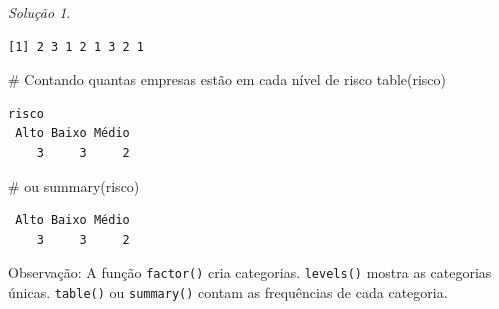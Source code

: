 \documentclass[
  portuguese,
  letterpaper,
  DIV=11,
  numbers=noendperiod]{scrreprt}
\newenvironment{Shaded}{\begin{snugshade}}{\end{snugshade}}
\newcommand{\CommentTok}[1]{\textcolor[rgb]{0.37,0.37,0.37}{#1}}
\newcommand{\FunctionTok}[1]{\textcolor[rgb]{0.28,0.35,0.67}{#1}}
\newcommand{\NormalTok}[1]{\textcolor[rgb]{0.00,0.23,0.31}{#1}}
\theoremstyle{definition}
\theoremstyle{remark}
\newtheorem*{solution}{Solução}
\begin{document}
\begin{solution}
\begin{verbatim}
[1] 2 3 1 2 1 3 2 1
\end{verbatim}

\begin{Shaded}
\begin{Highlighting}[]
\CommentTok{\# Contando quantas empresas estão em cada nível de risco}
\FunctionTok{table}\NormalTok{(risco)}
\end{Highlighting}
\end{Shaded}

\begin{verbatim}
risco
 Alto Baixo Médio 
    3     3     2 
\end{verbatim}

\begin{Shaded}
\begin{Highlighting}[]
\CommentTok{\# ou}
\FunctionTok{summary}\NormalTok{(risco)}
\end{Highlighting}
\end{Shaded}

\begin{verbatim}
 Alto Baixo Médio 
    3     3     2 
\end{verbatim}

Observação: A função \texttt{factor()} cria categorias.
\texttt{levels()} mostra as categorias únicas. \texttt{table()} ou
\texttt{summary()} contam as frequências de cada categoria.
\end{solution}
\end{document}
